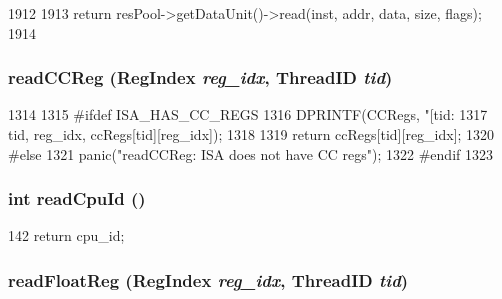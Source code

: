 \begin{DoxyCode}
1912 {
1913     return resPool->getDataUnit()->read(inst, addr, data, size, flags);
1914 }
\end{DoxyCode}
\hypertarget{classInOrderCPU_a958ede16b12c16df2d69b1614381edf1}{
\subsubsection[{readCCReg}]{ readCCReg ({\bf RegIndex} {\em reg\_\-idx}, \/  {\bf ThreadID} {\em tid})}}
\label{classInOrderCPU_a958ede16b12c16df2d69b1614381edf1}



\begin{DoxyCode}
1314 {
1315 #ifdef ISA_HAS_CC_REGS
1316     DPRINTF(CCRegs, "[tid:%
1317             tid, reg_idx, ccRegs[tid][reg_idx]);
1318 
1319     return ccRegs[tid][reg_idx];
1320 #else
1321     panic("readCCReg: ISA does not have CC regs\n");
1322 #endif
1323 }
\end{DoxyCode}
\hypertarget{classInOrderCPU_a65e0754207768ee6d2d6145cb0c5e3a5}{
\subsubsection[{readCpuId}]{\setlength{\rightskip}{0pt plus 5cm}int readCpuId ()}}
\label{classInOrderCPU_a65e0754207768ee6d2d6145cb0c5e3a5}



\begin{DoxyCode}
142 { return cpu_id; }
\end{DoxyCode}
\hypertarget{classInOrderCPU_aea9ee1636d5a4ee41fc873ab782096e5}{
\subsubsection[{readFloatReg}]{ readFloatReg ({\bf RegIndex} {\em reg\_\-idx}, \/  {\bf ThreadID} {\em tid})}}
\label{classInOrderCPU_aea9ee1636d5a4ee41fc873ab782096e5}




